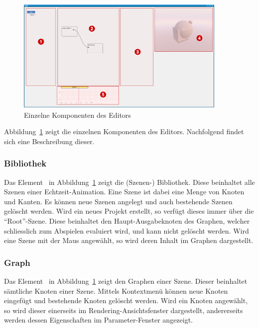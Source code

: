 \begin{figure}[H]
    \centering
    \includegraphics[width=0.9\textwidth]{img/editor_components.png}
    \caption{Einzelne Komponenten des
        Editors}\label{fig:main-components:editor:editor-components}
\end{figure}

Abbildung~\ref{fig:main-components:editor:editor-components} zeigt die
einzelnen Komponenten des Editors. Nachfolgend findet sich eine Beschreibung
dieser.

\subsubsection{Bibliothek}
\label{ssubsec:main-components:editor:library}

Das Element~ in
Abbildung~\ref{fig:main-components:editor:editor-components} zeigt die
(Szenen-) Bibliothek. Diese beinhaltet alle Szenen einer Echtzeit-Animation.
Eine Szene ist dabei eine Menge von Knoten und Kanten. Es können neue Szenen
angelegt und auch bestehende Szenen gelöscht werden. Wird ein neues Projekt
erstellt, so verfügt dieses immer über die ``Root''-Szene. Diese beinhaltet den
Haupt-Ausgabeknoten des Graphen, welcher schliesslich zum Abspielen evaluiert
wird, und kann nicht gelöscht werden. Wird eine Szene mit der Maus angewählt,
so wird deren Inhalt im Graphen dargestellt.

\subsubsection{Graph}
\label{ssubsec:main-components:editor:graph}

Das Element~ in
Abbildung~\ref{fig:main-components:editor:editor-components} zeigt den Graphen
einer Szene. Dieser beinhaltet sämtliche Knoten einer Szene. Mittels
Kontextmenü können neue Knoten eingefügt und bestehende Knoten gelöscht werden.
Wird ein Knoten angewählt, so wird dieser einerseits im
Rendering-Ansichtsfenster dargestellt, andererseits werden dessen Eigenschaften
im Parameter-Fenster angezeigt.

